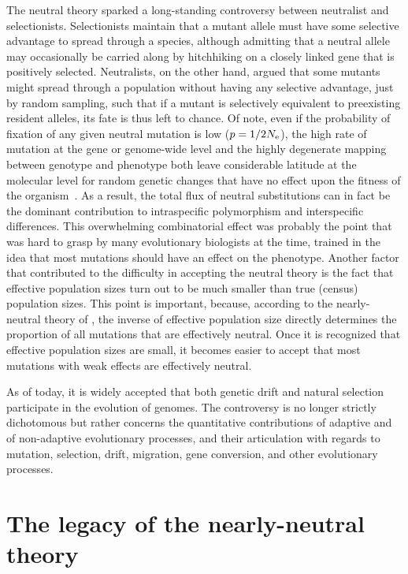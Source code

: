 The neutral theory sparked a long-standing controversy between neutralist and selectionists.
Selectionists maintain that a mutant allele must have some selective advantage to spread through a species, although admitting that a neutral allele may occasionally be carried along by hitchhiking on a closely linked gene that is positively selected.
Neutralists, on the other hand, argued that some mutants might spread through a population without having any selective advantage, just by random sampling, such that if a mutant is selectively equivalent to preexisting resident alleles, its fate is thus left to chance.
Of note, even if the probability of fixation of any given neutral mutation is low ($p = 1/2N_{\textrm{e}}$), the high rate of mutation at the gene or genome-wide level and the highly degenerate mapping between genotype and phenotype both leave considerable latitude at the molecular level for random genetic changes that have no effect upon the fitness of the organism~\citep{King1969}.
As a result, the total flux of neutral substitutions can in fact be the dominant contribution to intraspecific polymorphism and interspecific differences.
This overwhelming combinatorial effect was probably the point that was hard to grasp by many evolutionary biologists at the time, trained in the idea that most mutations should have an effect on the phenotype.
Another factor that contributed to the difficulty in accepting the neutral theory is the fact that effective population sizes turn out to be much smaller than true (census) population sizes.
This point is important, because, according to the nearly-neutral theory of \citet{Ohta1992}, the inverse of effective population size directly determines the proportion of all mutations that are effectively neutral.
Once it is recognized that effective population sizes are small, it becomes easier to accept that most mutations with weak effects are effectively neutral.

As of today, it is widely accepted that both genetic drift and natural selection participate in the evolution of genomes.
The controversy is no longer strictly dichotomous but rather concerns the quantitative contributions of adaptive and of non-adaptive evolutionary processes, and their articulation with regards to mutation, selection, drift, migration, gene conversion, and other evolutionary processes.


\section{The legacy of the nearly-neutral theory}
\label{sec:the-legacy-of-the-nearly-neutral-theory}

